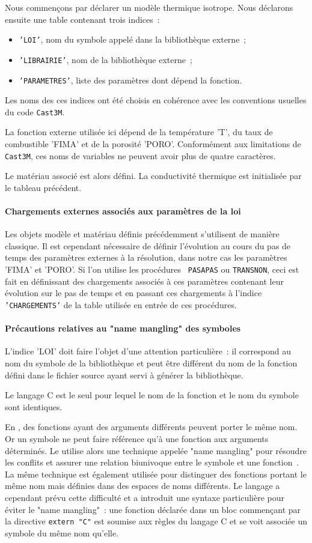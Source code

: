\documentclass[rectoverso,pleiades,pstricks,leqno,anti]{texmf/note_technique_2010}
\newcommand{\castem}{\texttt{Cast3M}}
\def\ifmonospace{\ifdim\fontdimen3\font=0pt }
\def\cpp{%
\ifmonospace%
    C++%
\else%
    C\kern-.1667em\raise.30ex\hbox{\smaller{++}}%
\fi%
\spacefactor1000 }
\begin{document}
Nous commençons par déclarer un modèle thermique isotrope. Nous
déclarons ensuite une table contenant trois indices~:
\begin{itemize}
  \item {\tt 'LOI'}, nom du symbole appelé dans la bibliothèque
  externe~;
  \item {\tt 'LIBRAIRIE'}, nom de la bibliothèque externe~;
  \item {\tt 'PARAMETRES'}, liste des paramètres dont dépend la
  fonction.
\end{itemize}
Les noms des ces indices ont été choisis en cohérence avec les
conventions usuelles du code \castem{}.

La fonction externe utilisée ici dépend de la température 'T', du taux
de combustible 'FIMA' et de la porosité 'PORO'. Conformément aux
limitations de \castem{}, ces noms de variables ne peuvent avoir plus de
quatre caractères.

Le matériau associé est alors défini. La conductivité thermique est
initialisée par le tableau précédent.

\paragraph{Chargements externes associés aux paramètres de la loi} Les
objets modèle et matériau définis précédemment s'utilisent de manière
classique. Il est cependant nécessaire de définir l'évolution au cours
du pas de temps des paramètres externes à la résolution, dans notre cas
les paramètres 'FIMA' et 'PORO'. Si l'on utilise les procédures {\tt
  PASAPAS} ou {\tt TRANSNON}, ceci est fait en définissant des
chargements associés à ces paramètres contenant leur évolution sur le
pas de temps et en passant ces chargements à l'indice {\tt
  'CHARGEMENTS'} de la table utilisée en entrée de ces procédures.

\paragraph{Précautions relatives au "name mangling" des symboles}
L'indice 'LOI' doit faire l'objet d'une attention particulière~: il
correspond au nom du symbole de la bibliothèque et peut être différent
du nom de la fonction défini dans le fichier source ayant servi à
générer la bibliothèque.

Le langage C est le seul pour lequel le nom de la fonction et le nom du
symbole sont identiques.

En \cpp, des fonctions ayant des arguments différents peuvent porter le
même nom. Or un symbole ne peut faire référence qu'à une fonction aux
arguments déterminés. Le \cpp utilise alors une technique appelée "name
mangling" pour résoudre les conflits et assurer une relation biunivoque
entre le symbole et une fonction~\cite{name_mangling_wikipedia}. La même
technique est également utilisée pour distinguer des fonctions portant
le même nom mais définies dans des espaces de noms différents. Le
langage a cependant prévu cette difficulté et a introduit une syntaxe
particulière pour éviter le "name mangling"~: une fonction déclarée dans
un bloc commençant par la directive {\tt extern "C"} est soumise aux
règles du langage C et se voit associée un symbole du même nom qu'elle.
\end{document}
